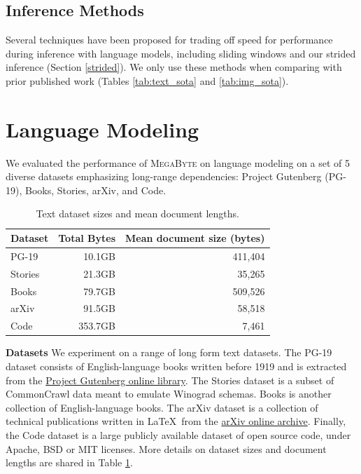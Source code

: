 \documentclass{article}
\newcommand{\fastslow}[0]{\textsc{MegaByte}\xspace}
\newcommand{\megabyte}[0]{\fastslow}
\theoremstyle{plain}
\theoremstyle{definition}
\theoremstyle{remark}
\begin{document}
\subsection{Inference Methods}
Several techniques have been proposed for trading off speed for performance during inference with language models, including sliding windows \cite{shortformer} and our strided inference (Section \ref{strided}). We only use these methods when comparing with prior published work (Tables \ref{tab:text_sota} and \ref{tab:img_sota}).

\section{Language Modeling}
We evaluated the performance of \megabyte on language modeling on a set of 5 diverse datasets emphasizing long-range dependencies: Project Gutenberg (PG-19), Books, Stories, arXiv, and Code. 
\begin{table}[t]
    \centering\small
    \begin{tabular}{lrr}
    \toprule
    Dataset & Total Bytes & Mean document size (bytes)  \\
    \midrule
    PG-19 & 10.1GB & 411,404 \\
    Stories & 21.3GB & 35,265 \\
    Books & 79.7GB & 509,526 \\
    arXiv & 91.5GB & 58,518 \\
    Code & 353.7GB & 7,461 \\
    \bottomrule
    \end{tabular}
    \caption{Text dataset sizes and mean document lengths.}
    \label{tab:document_lengths}
\end{table}

\textbf{Datasets} We experiment on a range of long form text datasets. The PG-19 dataset \cite{pg19} consists of English-language books written before 1919 and is extracted from the \href{https://www.gutenberg.org/}{Project Gutenberg online library}. The Stories dataset \cite{stories} is a subset of CommonCrawl data meant to emulate Winograd schemas. Books \cite{pile} is another collection of English-language books. The arXiv dataset is a collection of technical publications written in \LaTeX ~from the \href{arxiv.org}{arXiv online archive}. Finally, the Code dataset is a large publicly available dataset of open source code, under Apache, BSD or MIT licenses. More details on dataset sizes and document lengths are shared in Table \ref{tab:document_lengths}. 
\end{document}
